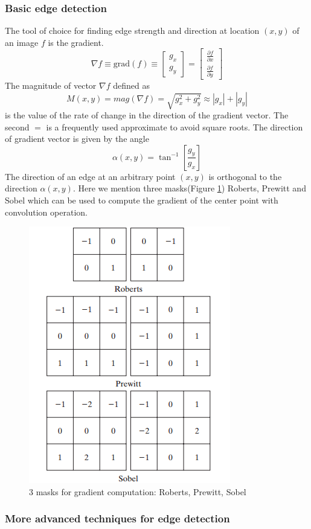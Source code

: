 \subsubsection{Basic edge detection}
The tool of choice for finding edge strength and direction at location $(x, y)$ of an image $f$ is the gradient. 
\begin{equation} \nabla f \equiv \text{grad}(f) \equiv \left[ \begin{array}{c} g_x \\ g_y \end{array}\right] = \left[ \begin{array}{c} \frac{\partial f}{\partial x} \\ \frac{\partial f}{\partial y} \end{array} \right] 
\end{equation}
The magnitude of vector $\nabla f$ defined as \begin{equation}M(x,y)=mag(\nabla f) =  \sqrt{g_x^2 + g_y^2} \approx |g_x| + |g_y| \end{equation} is the value of the rate of change in the direction of the gradient vector. The second $=$ is a frequently used approximate to avoid square roots. The direction of gradient vector is given by the angle \begin{equation} \alpha(x,y)=\tan^{-1} \left[ \frac{g_y}{g_x} \right] \end{equation}
The direction of an edge at an arbitrary point $(x,y)$ is orthogonal to the direction $\alpha(x,y)$. 
Here we mention three masks(Figure \ref{fig:3masks}) Roberts, Prewitt and Sobel which can be used to compute the gradient of the center point with convolution operation.
\begin{figure}[h!]
	\centering
	\includegraphics[scale=0.7]{myfigure/p9/3masks.png}
	\caption{3 masks for gradient computation: Roberts, Prewitt, Sobel}
	\label{fig:3masks}
\end{figure}

\subsubsection{More advanced techniques for edge detection}

